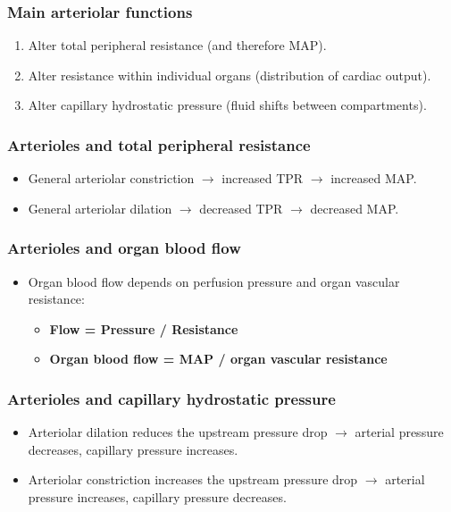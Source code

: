 \documentclass[11pt,a4paper]{article}
\begin{document}
\subsubsection{Main arteriolar functions}
\begin{enumerate}
\item Alter total peripheral resistance (and therefore MAP).
\item Alter resistance within individual organs (distribution of cardiac output).
\item Alter capillary hydrostatic pressure (fluid shifts between compartments).
\end{enumerate}

\subsubsection{Arterioles and total peripheral resistance}
\begin{itemize}
\item General arteriolar constriction $\rightarrow$ increased TPR $\rightarrow$ increased MAP.
\item General arteriolar dilation $\rightarrow$ decreased TPR $\rightarrow$ decreased MAP.
\end{itemize}

\subsubsection{Arterioles and organ blood flow}
\begin{itemize}
\item Organ blood flow depends on perfusion pressure and organ vascular resistance:
  \begin{itemize}
  \item \textbf{Flow = Pressure / Resistance}
  \item \textbf{Organ blood flow = MAP / organ vascular resistance}
  \end{itemize}
\end{itemize}

\subsubsection{Arterioles and capillary hydrostatic pressure}
\begin{itemize}
\item Arteriolar dilation reduces the upstream pressure drop $\rightarrow$ arterial pressure decreases, capillary pressure increases.
\item Arteriolar constriction increases the upstream pressure drop $\rightarrow$ arterial pressure increases, capillary pressure decreases.
\end{itemize}
\end{document}
